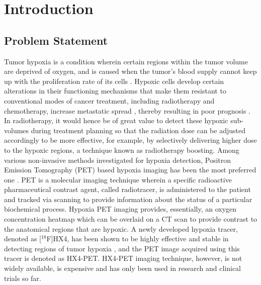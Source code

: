 \chapter{Introduction}
\label{Introduction}

\section{Problem Statement}
Tumor hypoxia is a condition wherein certain regions within the tumor volume are deprived of oxygen, and is caused when the tumor's blood supply cannot keep up with the proliferation rate of its cells \cite{hockel2001tumor}. Hypoxic cells develop certain alterations in their functioning mechanisms that make them resistant to conventional modes of cancer treatment, including radiotherapy and chemotherapy, increase metastatic spread \cite{muz2015role}, thereby resulting in poor prognosis \cite{vaupel2007hypoxia}. In radiotherapy, it would hence be of great value to detect these hypoxic sub-volumes during treatment planning so that the radiation dose can be adjusted accordingly to be more effective, for example, by selectively delivering higher dose to the hypoxic regions, a technique known as radiotherapy boosting. Among various non-invasive methods investigated for hypoxia detection, Positron Emission Tomography (PET) based hypoxia imaging has been the most preferred one \cite{fleming2015imaging}. PET is a molecular imaging technique wherein a specific radioactive pharmaceutical contrast agent, called radiotracer, is administered to the patient and tracked via scanning to provide information about the status of a particular biochemical process. Hypoxia PET imaging provides, essentially, an oxygen concentration heatmap which can be overlaid on a CT scan to provide contrast to the anatomical regions that are hypoxic. A newly developed hypoxia tracer, denoted as [$^18$F]HX4, has been shown to be highly effective and stable in detecting regions of tumor hypoxia \cite{sanduleanu2020hypoxia}, and the PET image acquired using this tracer is denoted as HX4-PET. HX4-PET imaging technique, however, is not widely available, is expensive and has only been used in research and clinical trials so far. 

